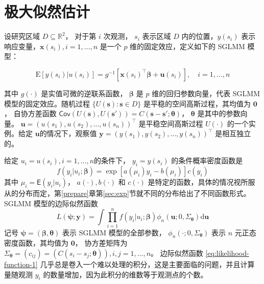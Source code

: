\documentclass[12pt,a4paper,UTF8,twoside]{book}
\theoremstyle{definition}
\theoremstyle{definition}
\theoremstyle{definition}
\theoremstyle{remark}
\begin{document}
\hypertarget{sec:mle}{%
\section{极大似然估计}\label{sec:mle}}

设研究区域 \(D \subseteq \mathbb{R}^2\)， 对于第 \(i\) 次观测， \(s_i\)
表示区域 \(D\) 内的位置，\(y(s_i)\)
表示响应变量，\(\mathbf{x}(s_i), i = 1, \ldots, n\) 是一个 \(p\)
维的固定效应，定义如下的 SGLMM 模型：

\[ \mathrm{E}[y(s_i)|u(s_i)] = g^{-1}[\mathbf{x}(s_i)^{\top}\boldsymbol{\beta} + \mathbf{u}(s_i)], \quad i = 1, \ldots, n \]

\noindent 其中 \(g(\cdot)\) 是实值可微的逆联系函数，
\(\boldsymbol{\beta}\) 是 \(p\) 维的回归参数向量，代表 SGLMM
模型的固定效应。随机过程 \(\{U(\mathbf{s}): \mathbf{s} \in D\}\)
是平稳的空间高斯过程，其均值为 \(\mathbf{0}\)， 自协方差函数
\(\mathsf{Cov}(U(\mathbf{s}),U(\mathbf{s}')) = C(\mathbf{s} - \mathbf{s}'; \boldsymbol{\theta})\)，
\(\boldsymbol{\theta}\) 是其中的参数向量。
\(\mathbf{u} = (u(s_1),u(s_2),\ldots,u(s_n))^{\top}\) 是平稳空间高斯过程
\(U(\cdot)\) 的一个实例。给定 \(\mathbf{u}\)的情况下，观察值
\(\mathbf{y} = (y(s_1),y(s_2),\ldots,y(s_n))^{\top}\) 是相互独立的。

给定 \(u_i = u(s_i), i = 1, \ldots, n\)的条件下， \(y_i = y(s_i)\)
的条件概率密度函数是
\[f(y_i|u_i;\boldsymbol{\beta}) = \exp[a(\mu_i)y_i - b(\mu_i)]c(y_i)\]
其中 \(\mu_i = \mathsf{E}(y_i|u_i)\)， \(a(\cdot),b(\cdot)\) 和
\(c(\cdot)\)
是特定的函数，具体的情况视所服从的分布而定，第\ref{prepare}章第\ref{sec:exp}节就不同的分布给出了不同函数形式。
SGLMM 模型的边际似然函数 \begin{equation}
L(\boldsymbol{\psi};\mathbf{y}) = \int \prod_{i=1}^{n} f(y_i|u_i;\boldsymbol{\beta})\phi_{n}(\mathbf{u};0,\Sigma_{\boldsymbol{\theta}})\mathrm{d}\mathbf{u} \label{eq:likelihood-function-1}
\end{equation} \noindent 记号
\(\boldsymbol{\psi} = (\boldsymbol{\beta},\boldsymbol{\theta})\) 表示
SGLMM 模型的全部参数，
\(\phi_{n}(\cdot;0,\Sigma_{\boldsymbol{\theta}})\) 表示 \(n\)
元正态密度函数，其均值为 \(\mathbf{0}\)， 协方差矩阵为
\(\Sigma_{\boldsymbol{\theta}} = (c_{ij}) = (C(s_i - s_j; \boldsymbol{\theta})), i,j = 1, \ldots, n\)。
边际似然函数 \eqref{eq:likelihood-function-1}
几乎总是卷入一个难以处理的积分，这是主要面临的问题，并且计算量随观测
\(y_i\) 的数量增加，因为此积分的维数等于观测点的个数。
\end{document}
